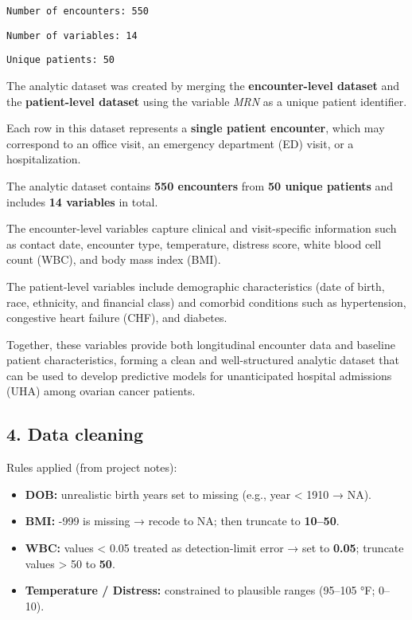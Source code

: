 \documentclass[
  letterpaper,
  DIV=11,
  numbers=noendperiod]{scrartcl}
\begin{document}
\begin{verbatim}
Number of encounters: 550 
\end{verbatim}

\begin{verbatim}
Number of variables: 14 
\end{verbatim}

\begin{verbatim}
Unique patients: 50 
\end{verbatim}

The analytic dataset was created by merging the \textbf{encounter-level
dataset} and the \textbf{patient-level dataset} using the variable
\emph{MRN} as a unique patient identifier.

Each row in this dataset represents a \textbf{single patient encounter},
which may correspond to an office visit, an emergency department (ED)
visit, or a hospitalization.

The analytic dataset contains \textbf{550 encounters} from \textbf{50
unique patients} and includes \textbf{14 variables} in total.

The encounter-level variables capture clinical and visit-specific
information such as contact date, encounter type, temperature, distress
score, white blood cell count (WBC), and body mass index (BMI).

The patient-level variables include demographic characteristics (date of
birth, race, ethnicity, and financial class) and comorbid conditions
such as hypertension, congestive heart failure (CHF), and diabetes.

Together, these variables provide both longitudinal encounter data and
baseline patient characteristics, forming a clean and well-structured
analytic dataset that can be used to develop predictive models for
unanticipated hospital admissions (UHA) among ovarian cancer patients.

\subsection{4. Data cleaning}\label{data-cleaning}

Rules applied (from project notes):

\begin{itemize}
\item
  \textbf{DOB:} unrealistic birth years set to missing (e.g., year
  \textless{} 1910 → NA).
\item
  \textbf{BMI:} -999 is missing → recode to NA; then truncate to
  \textbf{10--50}.
\item
  \textbf{WBC:} values \textless{} 0.05 treated as detection-limit error
  → set to \textbf{0.05}; truncate values \textgreater{} 50 to
  \textbf{50}.
\item
  \textbf{Temperature / Distress:} constrained to plausible ranges
  (95--105 °F; 0--10).
\end{itemize}
\end{document}
